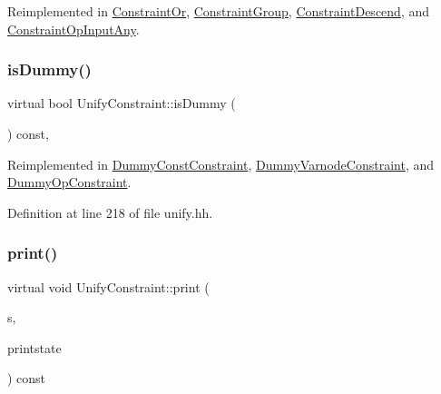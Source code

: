 Reimplemented in \mbox{\hyperlink{class_constraint_or_a34e54a45768c4fa9d30fb4624529d29b}{Constraint\+Or}}, \mbox{\hyperlink{class_constraint_group_a96670ed925bd7fa0146f091baf31e3b2}{Constraint\+Group}}, \mbox{\hyperlink{class_constraint_descend_aaf9c2b3a92648d9d13295791ade0afad}{Constraint\+Descend}}, and \mbox{\hyperlink{class_constraint_op_input_any_a819bcdb6da490558ba92e918090ea3e8}{Constraint\+Op\+Input\+Any}}.

\mbox{\label{class_unify_constraint_a260263ddd2fea5ac847302d12feeb031}} 
\subsubsection{\texorpdfstring{isDummy()}{isDummy()}}
{\footnotesize\ttfamily virtual bool Unify\+Constraint\+::is\+Dummy (\begin{DoxyParamCaption}\item[{void}]{ }\end{DoxyParamCaption}) const\hspace{0.3cm}{\ttfamily [inline]}, {\ttfamily [virtual]}}



Reimplemented in \mbox{\hyperlink{class_dummy_const_constraint_a64003bb0a15a9fa35fb634c8c98f8d1e}{Dummy\+Const\+Constraint}}, \mbox{\hyperlink{class_dummy_varnode_constraint_adabb4d2a9cc6eaaed1c2d98e1eb054ad}{Dummy\+Varnode\+Constraint}}, and \mbox{\hyperlink{class_dummy_op_constraint_a2153d437eb36b8f726b63d25dc7c3a09}{Dummy\+Op\+Constraint}}.



Definition at line 218 of file unify.\+hh.

\mbox{\label{class_unify_constraint_a774f6a611a96384766cb8e8d8f5ff41f}} 
\subsubsection{\texorpdfstring{print()}{print()}}
{\footnotesize\ttfamily virtual void Unify\+Constraint\+::print (\begin{DoxyParamCaption}\item[{ostream \&}]{s,  }\item[{\mbox{\hyperlink{class_unify_c_printer}{Unify\+C\+Printer}} \&}]{printstate }\end{DoxyParamCaption}) const\hspace{0.3cm}{\ttfamily [pure virtual]}}



